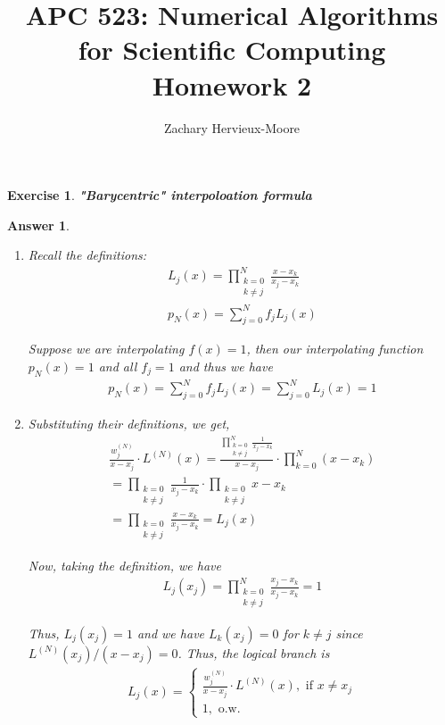 \documentclass[12pt]{article}
\title{APC 523: Numerical Algorithms for Scientific Computing \\ Homework 2}
\author{Zachary Hervieux-Moore}
\date{\displaydate{date}}
\theoremstyle{colon}
\newtheorem{exercise}{Exercise}
\newtheorem*{answer}{Answer}
\begin{document}
\maketitle

\clearpage

\begin{exercise}
  \textbf{"Barycentric" interpoloation formula}
\end{exercise}

\begin{answer}
  \begin{enumerate}[label=\alph*)]
    \item Recall the definitions:
      \begin{gather*}
        L_j(x) = \prod_{\substack{k = 0 \\ k \neq j}}^N \frac{x - x_k}{x_j - x_k} \\
        p_N(x) = \sum_{j=0}^N f_j L_j(x)
      \end{gather*}

      Suppose we are interpolating $f(x) = 1$, then our interpolating function $p_N(x) = 1$ and all $f_j = 1$ and thus we have
      \begin{gather*}
        p_N(x) = \sum_{j=0}^N f_j L_j(x) = \sum_{j=0}^N L_j(x) = 1
      \end{gather*}

    \item Substituting their definitions, we get,
      \begin{gather*}
        \frac{w_j^{(N)}}{x-x_j} \cdot L^{(N)}(x) = \frac{\prod_{\substack{k = 0 \\ k \neq j}}^N \frac{1}{x_j - x_k}}{x - x_j} \cdot \prod_{k=0}^N (x - x_k) \\
        = \prod_{\substack{k = 0 \\ k \neq j}} \frac{1}{x_j - x_k} \cdot \prod_{\substack{k = 0 \\ k \neq j}} x - x_k \\
        = \prod_{\substack{k = 0 \\ k \neq j}} \frac{x - x_k}{x_j - x_k} = L_j(x)
      \end{gather*}

      Now, taking the definition, we have
      \begin{gather*}
        L_j(x_j) = \prod_{\substack{k = 0 \\ k \neq j}}^N \frac{x_j - x_k}{x_j - x_k} = 1
      \end{gather*}

      Thus, $L_j(x_j)=1$ and we have $L_k(x_j) = 0$ for $k \neq j$  since $L^{(N)}(x_j)/(x-x_j) = 0$. Thus, the logical branch is
      \begin{gather*}
        L_j(x) = \begin{cases}
          \frac{w_j^{(N)}}{x-x_j} \cdot L^{(N)}(x), \text{ if } x \neq x_j \\
          1, \text{ o.w.}
        \end{cases}
      \end{gather*}


\end{enumerate}
\end{answer}
\end{document}
